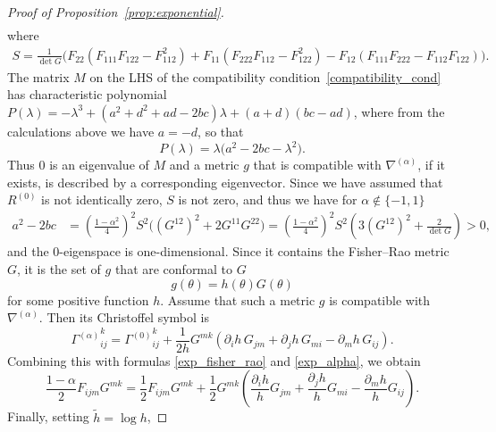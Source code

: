 \documentclass[11pt,reqno]{amsart}
\theoremstyle{definition}
\newcommand{\na}{\nabla^{(\alpha)}}
\begin{document}
\begin{proof}[Proof of Proposition~\ref{prop:exponential}]
\begin{align*}
\end{align*}
where
\begin{align*}
S=\frac{1}{\det G}\big(F_{22}(F_{111}F_{122}-F_{112}^2)+F_{11}(F_{222}F_{112}-F_{122}^2)-F_{12}(F_{111}F_{222}-F_{112}F_{122})\big).
\end{align*}
The matrix $M$ on the LHS of the compatibility condition~\eqref{compatibility_cond} has characteristic polynomial
$P(\lambda)=-\lambda^3+(a^2+d^2+ad-2bc)\lambda+(a+d)(bc-ad)$, where from the calculations above we have $a=-d$, so that
$$P(\lambda)=\lambda\big(a^2-2bc-\lambda^2\big).$$
Thus $0$ is an eigenvalue of $M$ and a metric $g$ that is compatible with $\na$, if it exists, is described by a corresponding eigenvector. %
Since we have assumed that $R^{(0)}$ is not identically zero, $S$ is not zero, and thus we have for $\alpha\notin\{-1,1\}$
\begin{align*}
a^2-2bc&=\left(\frac{1-\alpha^2}{4}\right)^2S^2\big((G^{12})^2+2G^{11}G^{22}\big)=\left(\frac{1-\alpha^2}{4}\right)^2S^2\left(3(G^{12})^2+\frac{2}{\det G}\right)>0,
\end{align*}
and the $0$-eigenspace is one-dimensional. 
Since it contains the Fisher--Rao metric $G$, it is the set of $g$ that are conformal to $G$
$$g(\theta)=h(\theta)G(\theta)$$
for some positive function $h$. Assume that such a metric $g$ is compatible with $\nabla^{(\alpha)}$. Then its Christoffel symbol is
$${\Gamma^{(\alpha)}}_{ij}^k={\Gamma^{(0)}}_{ij}^k+\frac{1}{2h}G^{mk}\left(\partial_ih\,G_{jm}+\partial_j h\,G_{mi}-\partial_mh\,G_{ij}\right).$$
Combining this with formulas \eqref{exp_fisher_rao} and \eqref{exp_alpha}, we obtain
$$\frac{1-\alpha}{2} F_{ijm}G^{mk}=\frac{1}{2}F_{ijm}G^{mk}+\frac{1}{2}G^{mk}\left(\frac{\partial_ih}{h}G_{jm}+\frac{\partial_j h}{h}G_{mi}-\frac{\partial_mh}{h}G_{ij}\right).$$
Finally, setting $\tilde h=\log h$,

\end{proof}
\end{document}
